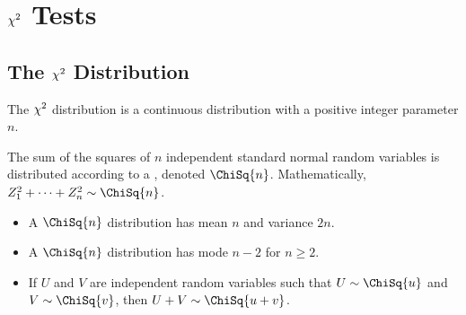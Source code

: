 \section{\texorpdfstring{$\chi^2$}{Chi-Squared} Tests}

\subsection{The \texorpdfstring{$\chi^2$}{Chi-Squared} Distribution}

The $\chi^2$ distribution is a continuous distribution with a positive integer parameter $n$.

\begin{definition}
    The sum of the squares of $n$ independent standard normal random variables is distributed according to a , denoted $\ChiSq{n}$. Mathematically, $Z_1^2 + \dots + Z_n^2 \sim \ChiSq{n}$.
\end{definition}

\begin{fact}
    \phantom{.}
    \begin{itemize}
        \item A $\ChiSq{n}$ distribution has mean $n$ and variance $2n$.
        \item A $\ChiSq{n}$ distribution has mode $n - 2$ for  $n \geq 2$.
        \item If $U$ and $V$ are independent random variables such that $U \sim \ChiSq{u}$ and $V \sim \ChiSq{v}$, then $U + V \sim \ChiSq{u + v}$.
    \end{itemize}
\end{fact}

